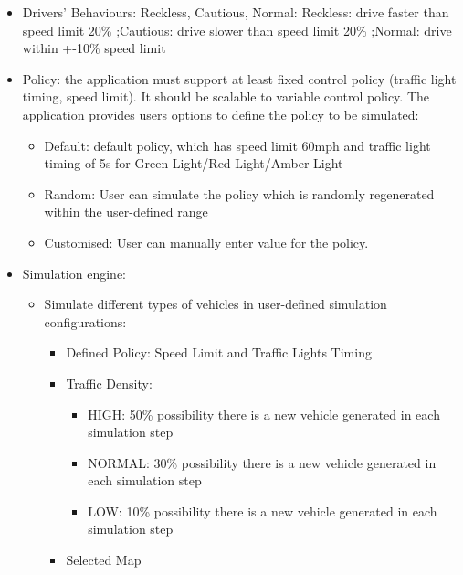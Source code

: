 \documentclass[11pt]{article}
\begin{document}
{\begin{itemize}
\begin{itemize}
        
        \item Drivers' Behaviours: Reckless, Cautious, Normal:
        Reckless: drive faster than speed limit 20\%
        ;Cautious: drive slower than speed limit 20\%
        ;Normal: drive within +-10\% speed limit
        
        \item Policy: the application must support at least fixed control policy (traffic light timing, speed limit). It should be scalable to variable control policy. The application provides users options to define the policy to be simulated:
            \begin{itemize}
                \item Default: default policy, which has speed limit 60mph and traffic light timing of 5s for Green Light/Red Light/Amber Light
                \item Random: User can simulate the policy which is randomly regenerated within the user-defined range
                \item Customised: User can manually enter value for the policy.
            \end{itemize}

        \item Simulation engine: 
        \begin{itemize}
        
        \item Simulate different types of vehicles in user-defined simulation configurations:
            \begin{itemize}
            \item Defined Policy: Speed Limit and Traffic Lights Timing
            \item Traffic Density:
                \begin{itemize}
                \item HIGH: 50\% possibility there is a new vehicle generated in each simulation step
                 \item NORMAL: 30\% possibility there is a new vehicle generated in each simulation step
                
                \item LOW: 10\% possibility there is a new vehicle generated in each simulation step
                \end{itemize}
            \item Selected Map
            
            
            \end{itemize}
        

\end{itemize}
\end{itemize}
\end{itemize}}
\end{document}

